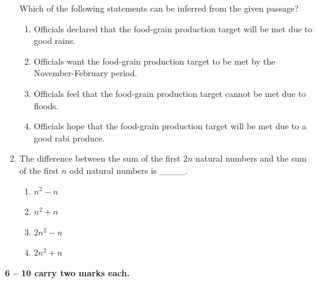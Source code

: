 \documentclass[journal,12pt,onecolumn]{IEEEtran}
\begin{document}
\begin{enumerate}[label=\arabic*.]
Which of the following statements can be inferred from the given passage?
\begin{enumerate}[label=(\Alph*)]
    \item Officials declared that the food-grain production target will be met due to good rains.
    \item Officials want the food-grain production target to be met by the November-February period.
    \item Officials feel that the food-grain production target cannot be met due to floods.
    \item Officials hope that the food-grain production target will be met due to a good rabi produce.
\end{enumerate}


\item The difference between the sum of the first $2n$ natural numbers and the sum of the first $n$ odd natural numbers is \_\_\_\_.
\begin{multicols}{2}
\begin{enumerate}[label=(\Alph*)]
    \item $n^2 - n$
    \item $n^2 + n$
    \item $2n^2 - n$
    \item $2n^2 + n$
\end{enumerate}
\end{multicols}

\end{enumerate}
\noindent \textbf{6 -- 10 carry two marks each.}
\end{document}
